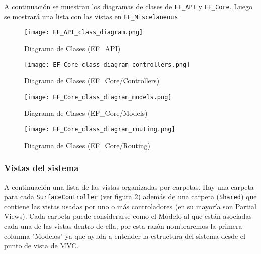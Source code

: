 A continuación se muestran los diagramas de clases de \verb|EF_API| y \verb|EF_Core|. Luego se mostrará una lista con las vistas en \verb|EF_Miscelaneous|.

\begin{figure}[H]
    \texttt{[image: EF\_API\_class\_diagram.png]}
    \caption{Diagrama de Clases (EF\_API)}
    \label{fig:EF_API_class_diagram}
    \centering
\end{figure}

\begin{figure}[H]
    \texttt{[image: EF\_Core\_class\_diagram\_controllers.png]}
    \caption{Diagrama de Clases (EF\_Core/Controllers)}
    \label{fig:EF_Core_class_diagram_controllers}
    \centering
\end{figure}

\begin{figure}[H]
    \texttt{[image: EF\_Core\_class\_diagram\_models.png]}
    \caption{Diagrama de Clases (EF\_Core/Models)}
    \label{fig:EF_Core_class_diagram_models}
    \centering
\end{figure}

\begin{figure}[H]
    \texttt{[image: EF\_Core\_class\_diagram\_routing.png]}
    \caption{Diagrama de Clases (EF\_Core/Routing)}
    \label{fig:EF_Core_class_diagram_routing}
    \centering
\end{figure}

\subsubsection{Vistas del sistema}
A continuación una lista de las vistas organizadas por carpetas. Hay una carpeta para cada \verb|SurfaceController| (ver figura \ref{fig:EF_Core_class_diagram_controllers}) además de una carpeta (\verb|Shared|) que contiene las vistas usadas por uno o más controladores (en su mayoría son Partial Views). Cada carpeta puede considerarse como el Modelo al que están asociadas cada una de las vistas dentro de ella, por esta razón nombraremos la primera columna "Modelos" ya que ayuda a entender la estructura del sistema desde el punto de vista de MVC.

